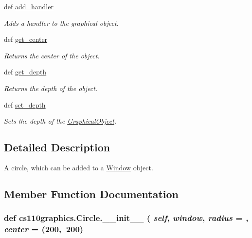 \begin{DoxyCompactItemize}
def \hyperlink{classcs110graphics_1_1GraphicalObject_adb1af0d5a6baae3f9a08d21a3227c49f}{add\_\-handler}
\begin{DoxyCompactList}\small\item\em Adds a handler to the graphical object. \item\end{DoxyCompactList}\item 
def \hyperlink{classcs110graphics_1_1GraphicalObject_a062789c4cc9de38af32dcc4ff2058607}{get\_\-center}
\begin{DoxyCompactList}\small\item\em Returns the center of the object. \item\end{DoxyCompactList}\item 
def \hyperlink{classcs110graphics_1_1GraphicalObject_a6d9f5718cd0cf249e0d2842971bae17f}{get\_\-depth}
\begin{DoxyCompactList}\small\item\em Returns the depth of the object. \item\end{DoxyCompactList}\item 
def \hyperlink{classcs110graphics_1_1GraphicalObject_a20d76d4ee4419c3065d61deb6cbc6700}{set\_\-depth}
\begin{DoxyCompactList}\small\item\em Sets the depth of the \hyperlink{classcs110graphics_1_1GraphicalObject}{GraphicalObject}. \item\end{DoxyCompactList}\end{DoxyCompactItemize}


\subsection{Detailed Description}
A circle, which can be added to a \hyperlink{classcs110graphics_1_1Window}{Window} object. 

\subsection{Member Function Documentation}
\hypertarget{classcs110graphics_1_1Circle_a7c92c173c0e9666d0682c48fbd170e9f}{
\subsubsection[{\_\-\_\-init\_\-\_\-}]{\setlength{\rightskip}{0pt plus 5cm}def cs110graphics.Circle.\_\-\_\-init\_\-\_\- ( {\em self}, \/   {\em window}, \/   {\em radius} = {}, \/   {\em center} = {\ttfamily (200,~200})}}
\label{classcs110graphics_1_1Circle_a7c92c173c0e9666d0682c48fbd170e9f}

